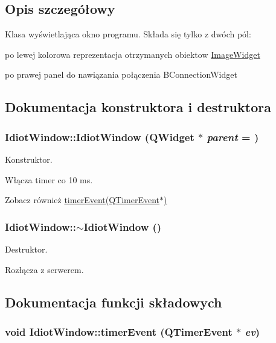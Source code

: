 \subsection{Opis szczegółowy}
Klasa wyświetlająca okno programu. Składa się tylko z dwóch pól: \begin{DoxyItemize}
\item po lewej kolorowa reprezentacja otrzymanych obiektow \hyperlink{class_image_widget}{ImageWidget} \item po prawej panel do nawiązania połączenia BConnectionWidget \end{DoxyItemize}


\subsection{Dokumentacja konstruktora i destruktora}
\hypertarget{class_idiot_window_a028f2a727c252dcb9448a08d1379d699}{
\subsubsection[{IdiotWindow}]{\setlength{\rightskip}{0pt plus 5cm}IdiotWindow::IdiotWindow (QWidget $\ast$ {\em parent} = {})}}
\label{class_idiot_window_a028f2a727c252dcb9448a08d1379d699}


Konstruktor. 

Włącza timer co 10 ms. \begin{DoxySeeAlso}{Zobacz również}
\hyperlink{class_idiot_window_a0e90dfa970f643c1d42d1449d648cf50}{timerEvent(QTimerEvent$\ast$)} 
\end{DoxySeeAlso}
\hypertarget{class_idiot_window_a2a5adb99723cac75bcf4c843653ef76b}{
\subsubsection[{$\sim$IdiotWindow}]{\setlength{\rightskip}{0pt plus 5cm}IdiotWindow::$\sim$IdiotWindow ()}}
\label{class_idiot_window_a2a5adb99723cac75bcf4c843653ef76b}


Destruktor. 

Rozłącza z serwerem. 

\subsection{Dokumentacja funkcji składowych}
\hypertarget{class_idiot_window_a0e90dfa970f643c1d42d1449d648cf50}{
\subsubsection[{timerEvent}]{\setlength{\rightskip}{0pt plus 5cm}void IdiotWindow::timerEvent (QTimerEvent $\ast$ {\em ev})}}
\label{class_idiot_window_a0e90dfa970f643c1d42d1449d648cf50}


